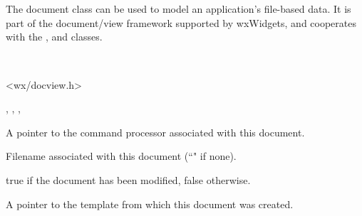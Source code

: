 \section{}\label{wxdocument}

The document class can be used to model an application's file-based
data. It is part of the document/view framework supported by wxWidgets,
and cooperates with the , \rtfsp
and  classes.


\\


<wx/docview.h>




, ,\rtfsp
{}, 


\label{wxdocumentmcommandprocessor}


A pointer to the command processor associated with this document.

\label{wxdocumentmdocumentfile}


Filename associated with this document (``" if none).

\label{wxdocumentmdocumentmodified}


true if the document has been modified, false otherwise.

\label{wxdocumentmdocumenttemplate}


A pointer to the template from which this document was created.

